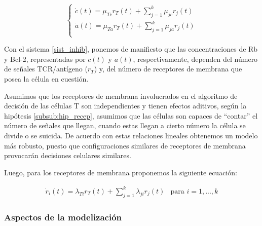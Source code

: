 \begin{equation}
	\label{sist_inhib}
	\left\{ \begin{array}{l}
	\dot{c}(t) = \mu_{Tc}r_{T}(t) + \sum_{j=1}^{k}\mu_{jc}r_{j}(t)\\
	\dot{a}(t) = \mu_{Ta}r_{T}(t) + \sum_{j=1}^{k}\mu_{ja}r_{j}(t) \\
	\end{array}
	\right.
\end{equation}

Con el sistema \ref{sist_inhib}, ponemos de manifiesto que las concentraciones de Rb y Bcl-2, representadas por $c(t)$ y $a(t)$, respectivamente, dependen del número de señales TCR/antígeno ($r_{T}$) y, del número de receptores de membrana que posea la célula en cuestión.

Asumimos que los receptores de membrana involucrados en el algoritmo de decisión de las células T son independientes y tienen efectos aditivos, según la hipótesis \ref{subsub:hip_recep}, asumimos que las células son capaces de ``contar'' el número de señales que llegan, cuando estas llegan a cierto número la célula se divide o se suicida. De acuerdo con estas relaciones lineales obtenemos un modelo más robusto, puesto que configuraciones similares de receptores de membrana provocarán decisiones celulares similares. 

Luego, para los receptores de membrana proponemos la siguiente ecuación: 

\begin{equation}
	\label{sist_recep}
	\begin{array}{ll}
	\dot{r}_{i}(t) = \lambda_{Ti}r_{T}(t) + \sum_{j=1}^{k}\lambda_{ji}r_{j}(t) & \mbox{para $i=1,...,k$} 
	\end{array}
\end{equation}


\subsubsection{Aspectos de la modelización}

